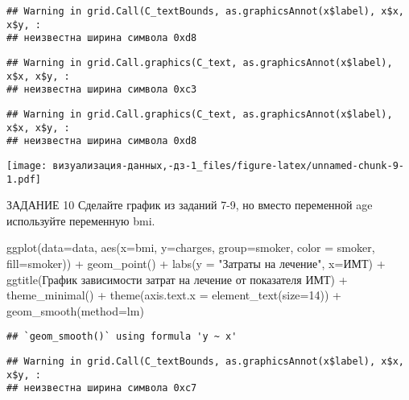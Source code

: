 \documentclass[
]{article}
\newenvironment{Shaded}{\begin{snugshade}}{\end{snugshade}}
\newcommand{\AttributeTok}[1]{\textcolor[rgb]{0.77,0.63,0.00}{#1}}
\newcommand{\DecValTok}[1]{\textcolor[rgb]{0.00,0.00,0.81}{#1}}
\newcommand{\FunctionTok}[1]{\textcolor[rgb]{0.00,0.00,0.00}{#1}}
\newcommand{\NormalTok}[1]{#1}
\newcommand{\SpecialCharTok}[1]{\textcolor[rgb]{0.00,0.00,0.00}{#1}}
\newcommand{\StringTok}[1]{\textcolor[rgb]{0.31,0.60,0.02}{#1}}
\begin{document}
\begin{verbatim}
## Warning in grid.Call(C_textBounds, as.graphicsAnnot(x$label), x$x, x$y, :
## неизвестна ширина символа 0xd8
\end{verbatim}

\begin{verbatim}
## Warning in grid.Call.graphics(C_text, as.graphicsAnnot(x$label), x$x, x$y, :
## неизвестна ширина символа 0xc3
\end{verbatim}

\begin{verbatim}
## Warning in grid.Call.graphics(C_text, as.graphicsAnnot(x$label), x$x, x$y, :
## неизвестна ширина символа 0xd8
\end{verbatim}

\texttt{[image: визуализация-данных,-дз-1\_files/figure-latex/unnamed-chunk-9-1.pdf]}

ЗАДАНИЕ 10 Сделайте график из заданий 7-9, но вместо переменной age
используйте переменную bmi.

\begin{Shaded}
\begin{Highlighting}[]
\FunctionTok{ggplot}\NormalTok{(}\AttributeTok{data=}\NormalTok{data, }\FunctionTok{aes}\NormalTok{(}\AttributeTok{x=}\NormalTok{bmi, }\AttributeTok{y=}\NormalTok{charges, }\AttributeTok{group=}\NormalTok{smoker, }\AttributeTok{color =}\NormalTok{ smoker, }\AttributeTok{fill=}\NormalTok{smoker)) }\SpecialCharTok{+}
  \FunctionTok{geom\_point}\NormalTok{() }\SpecialCharTok{+}
  \FunctionTok{labs}\NormalTok{(}\AttributeTok{y =} \StringTok{"Затраты на лечение"}\NormalTok{, }\AttributeTok{x=}\StringTok{\textquotesingle{}ИМТ\textquotesingle{}}\NormalTok{) }\SpecialCharTok{+}
  \FunctionTok{ggtitle}\NormalTok{(}\StringTok{\textquotesingle{}График зависимости затрат на лечение от показателя ИМТ\textquotesingle{}}\NormalTok{) }\SpecialCharTok{+}
  \FunctionTok{theme\_minimal}\NormalTok{() }\SpecialCharTok{+}
  \FunctionTok{theme}\NormalTok{(}\AttributeTok{axis.text.x =} \FunctionTok{element\_text}\NormalTok{(}\AttributeTok{size=}\DecValTok{14}\NormalTok{)) }\SpecialCharTok{+}
  \FunctionTok{geom\_smooth}\NormalTok{(}\AttributeTok{method=}\NormalTok{lm)}
\end{Highlighting}
\end{Shaded}

\begin{verbatim}
## `geom_smooth()` using formula 'y ~ x'
\end{verbatim}

\begin{verbatim}
## Warning in grid.Call(C_textBounds, as.graphicsAnnot(x$label), x$x, x$y, :
## неизвестна ширина символа 0xc7
\end{verbatim}
\end{document}
